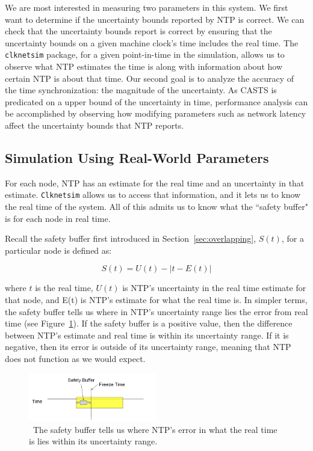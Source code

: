 We are most interested in measuring two parameters in this system. We
first want to determine if the uncertainty bounds reported by NTP is
correct. We can check that the uncertainty bounds report is correct
by ensuring that the uncertainty bounds on a given machine clock's
time includes the real time.  The \texttt{clknetsim} package, for a
given point-in-time in the simulation, allows us to observe what NTP
estimates the time is along with information about how certain NTP is
about that time. Our second goal is to analyze the accuracy of the
time synchronization: the magnitude of the uncertainty.  As 
CASTS is predicated on a upper bound of the uncertainty in time,
performance analysis can be accomplished by observing how modifying
parameters such as network latency affect the uncertainty bounds
that NTP reports.

\subsection{Simulation Using Real-World Parameters}

For each node, NTP has an estimate for the real time and an uncertainty
in that estimate. \texttt{Clknetsim} allows us to access that information, and
it lets us to know the real time of the system. All of this admits
us to know what the ``safety buffer" is for each node in real time.

Recall the safety buffer first introduced in Section~\ref{sec:overlapping}, $S(t)$,  for a particular node is defined as:

\[ S(t) = U(t) - | t - E(t)| \]

where $t$ is the real time, $U(t)$ is NTP's uncertainty in the real
time estimate for that node, and E(t) is NTP's estimate for what the
real time is. In simpler terms, the safety buffer tells us where in NTP's
uncertainty range lies the error from real time (see
Figure~\ref{fig:safety-diag}). If the safety buffer is a positive
value, then the difference between NTP's estimate and real time is
within its uncertainty range. If it is negative, then its error is
outside of its uncertainty range, meaning that NTP does not function as
we would expect.

\begin{figure}[!htbp]
  \caption{~The safety buffer tells us where NTP's error in what the real time is lies within its uncertainty range.} 
  \label{fig:safety-diag}
  \centering
  \includegraphics[width=0.5\textwidth]{safety-diagram.png}
\end{figure}

